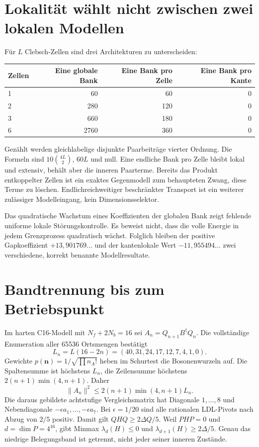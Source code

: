 \section{Lokalität wählt nicht zwischen zwei lokalen Modellen}
Für $L$ Clebsch-Zellen sind drei Architekturen zu unterscheiden:
\begin{center}\begin{tabular}{lrrr}
\toprule Zellen&Eine globale Bank&Eine Bank pro Zelle&Eine Bank pro Kante\\\midrule
1&60&60&0\\2&280&120&0\\3&660&180&0\\6&2760&360&0\\\bottomrule
\end{tabular}\end{center}
Gezählt werden gleichlabelige disjunkte Paarbeiträge vierter Ordnung. Die Formeln sind $10\binom{4L}{2}$, $60L$ und null. Eine endliche Bank pro Zelle bleibt lokal und extensiv, behält aber die inneren Paarterme. Bereits das Produkt entkoppelter Zellen ist ein exaktes Gegenmodell zum behaupteten Zwang, diese Terme zu löschen. Endlichreichweitiger beschränkter Transport ist ein weiterer zulässiger Modelleingang, kein Dimensionsselektor.

Das quadratische Wachstum eines Koeffizienten der globalen Bank zeigt fehlende uniforme lokale Störungskontrolle. Es beweist nicht, dass die volle Energie in jedem Grenzprozess quadratisch wächst. Folglich bleiben der positive Gapkoeffizient $+13{,}901769\ldots$ und der kantenlokale Wert $-11{,}955494\ldots$ zwei verschiedene, korrekt benannte Modellresultate.

\section{Bandtrennung bis zum Betriebspunkt}
Im harten C16-Modell mit $N_f+2N_b=16$ sei $A_n=Q_{n+1}B^\dagger Q_n$. Die vollständige Enumeration aller 65536 Ortsmengen bestätigt
\begin{equation}
L_n=L(16-2n)=(40,31,24,17,12,7,4,1,0).
\end{equation}
Gewichte $p(\mathbf n)=1/\sqrt{\prod n_A!}$ heben im Schurtest die Bosonenwurzeln auf. Die Spaltensumme ist höchstens $L_n$, die Zeilensumme höchstens $2(n+1)\min(4,n+1)$. Daher
\begin{equation}
\|A_n\|^2\le 2(n+1)\min(4,n+1)L_n.
\end{equation}
Die daraus gebildete achtstufige Vergleichsmatrix hat Diagonale $1,\ldots,8$ und Nebendiagonale $-\epsilon a_1,\ldots,-\epsilon a_7$. Bei $\epsilon=1/20$ sind alle rationalen LDL-Pivots nach Abzug von $2/5$ positiv. Damit gilt $QHQ\ge2\Delta Q/5$. Weil $PHP=0$ und $d=\dim P=4^{16}$, gibt Minmax $\lambda_d(H)\le0$ und $\lambda_{d+1}(H)\ge2\Delta/5$. Genau das niedrige Belegungsband ist getrennt, nicht jeder seiner inneren Zustände.

